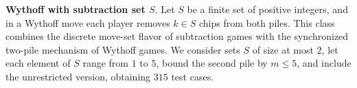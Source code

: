 \documentclass[review]{elsarticle}
\newcommand{\set}[1]{\{ #1 \}}
\newcommand{\tuple}[1]{\langle {#1} \rangle}
\newcommand{\true}{\top}
\newcommand{\statevar}{\mathcal{X}}
\newcommand{\act}{\mathcal{A}}
\newcommand{\constraint}{\mathcal{C}}
\newcommand{\estate}{\mathcal{E}}
\newcommand{\pre}{\mathtt{pre}}
\newcommand{\eff}{\mathtt{eff}}
\begin{document}
{\color{red}\textbf{Wythoff with subtraction set $S$}. Let $S$ be a finite set of positive integers, and in a Wythoff move each player removes $k \in S$ chips from both piles.}
{\color{red}This class combines the discrete move-set flavor of subtraction games with the synchronized two-pile mechanism of Wythoff games.}
{\color{red}We consider sets $S$ of size at most $2$, let each element of $S$ range from $1$ to $5$, bound the second pile by $m \le 5$, and include the unrestricted version, obtaining $315$ test cases.}
\end{document}
